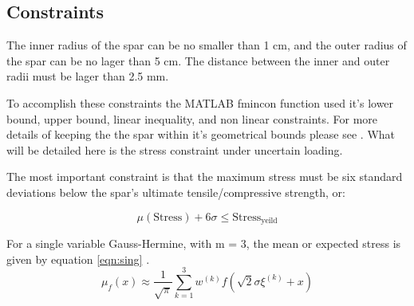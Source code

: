\documentclass[12pt]{article}
\begin{document}
	

	

	\subsection{Constraints}
	
	The inner radius of the spar can be no smaller than 1 cm, and the outer radius of the spar can be no lager than 5 cm. The distance between the inner and outer radii must be lager than 2.5 mm. 
	
	
	
	To accomplish these constraints the MATLAB fmincon function used it's lower bound, upper bound, linear inequality, and non linear constraints. For more details of keeping the the spar within it's geometrical bounds please see \cite{hoddinottP2}. What will be detailed here is the stress constraint under uncertain loading. 
	
	
	The most important constraint is that the maximum stress must be six standard deviations below the spar's ultimate tensile/compressive strength, or:
	
	\begin{equation}
\mu(\text{Stress})+ 6 \sigma \leq \text{Stress}_\text{yeild}
	\end{equation}
	
	For a single variable Gauss-Hermine, with m = 3, the mean or expected stress is given by equation \ref{eqn:sing} \cite{Hicken18}. 
	\begin{equation}
	\mu _ { f } ( x ) \approx \frac { 1 } { \sqrt { \pi } } \sum _ { k = 1 } ^ { 3 } w ^ { ( k ) } f \left( \sqrt { 2 } \sigma \xi ^ { ( k ) } + x \right)
	\label{eqn:sing}
	\end{equation}
\end{document}
